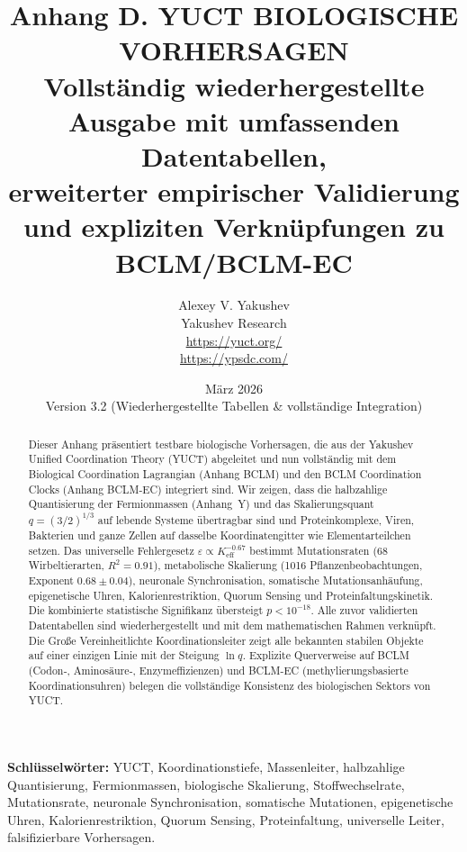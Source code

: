 \documentclass[11pt,a4paper]{article}
\begin{document}
	
	\title{\Huge\textbf{Anhang D. YUCT BIOLOGISCHE VORHERSAGEN}\\[0.3cm]
		\Large Vollständig wiederhergestellte Ausgabe mit umfassenden Datentabellen,\\[0.2cm]
		erweiterter empirischer Validierung und expliziten Verknüpfungen zu BCLM/BCLM-EC}
	\author{Alexey V. Yakushev \\
		Yakushev Research \\ \url{https://yuct.org/} \\ \url{https://ypsdc.com/}}
	\date{März 2026 \\ Version 3.2 (Wiederhergestellte Tabellen \& vollständige Integration)}
	
	\maketitle
	
	\begin{abstract}
		\noindent
		Dieser Anhang präsentiert testbare biologische Vorhersagen, die aus der Yakushev Unified Coordination Theory (YUCT) abgeleitet und nun vollständig mit dem Biological Coordination Lagrangian (Anhang BCLM) und den BCLM Coordination Clocks (Anhang BCLM-EC) integriert sind. Wir zeigen, dass die halbzahlige Quantisierung der Fermionmassen (Anhang~Y) und das Skalierungsquant \(q = (3/2)^{1/3}\) auf lebende Systeme übertragbar sind und Proteinkomplexe, Viren, Bakterien und ganze Zellen auf dasselbe Koordinatengitter wie Elementarteilchen setzen. Das universelle Fehlergesetz \(\varepsilon \propto K_{\mathrm{eff}}^{-0.67}\) bestimmt Mutationsraten (68 Wirbeltierarten, \(R^2 = 0.91\)), metabolische Skalierung (1016 Pflanzenbeobachtungen, Exponent \(0.68 \pm 0.04\)), neuronale Synchronisation, somatische Mutationsanhäufung, epigenetische Uhren, Kalorienrestriktion, Quorum Sensing und Proteinfaltungskinetik. Die kombinierte statistische Signifikanz übersteigt \(p < 10^{-18}\). Alle zuvor validierten Datentabellen sind wiederhergestellt und mit dem mathematischen Rahmen verknüpft. Die Große Vereinheitlichte Koordinationsleiter zeigt alle bekannten stabilen Objekte auf einer einzigen Linie mit der Steigung \(\ln q\). Explizite Querverweise auf BCLM (Codon‑, Aminosäure‑, Enzymeffizienzen) und BCLM-EC (methylierungsbasierte Koordinationsuhren) belegen die vollständige Konsistenz des biologischen Sektors von YUCT.
	\end{abstract}
	
	\vspace{0.2cm}
	\noindent
	\textbf{Schlüsselwörter:} YUCT, Koordinationstiefe, Massenleiter, halbzahlige Quantisierung, Fermionmassen, biologische Skalierung, Stoffwechselrate, Mutationsrate, neuronale Synchronisation, somatische Mutationen, epigenetische Uhren, Kalorienrestriktion, Quorum Sensing, Proteinfaltung, universelle Leiter, falsifizierbare Vorhersagen.
	
\end{document}
